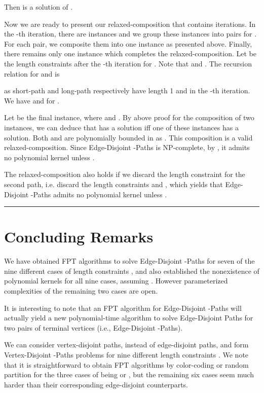 \documentclass{llncs}
\def\qed{\rule{1.5mm}{3mm}}
\begin{document}
{	Then  is a solution of . 
	

	Now we are ready to present our relaxed-composition that contains  iterations.
	In the -th iteration, there are  instances and 
	we group these instances into  pairs for . 
	For each pair, we composite them into one instance as presented above. 
	Finally, there remains only one instance which completes the relaxed-composition.
	Let  be the length constraints after the -th iteration for . 
	Note that  and . 
	The recursion relation for  and  is 
	 
	as short-path and long-path respectively have length 1 and  in the -th iteration. 
	We have  and  for . 
	
	Let  be the final instance, 
	where  and . 
	By above proof for the composition of two instances, 
	we can deduce that  has a solution 
	iff one of these  instances has a solution. 
	Both  and  are polynomially bounded in  as . 
	This composition is a valid relaxed-composition. 
	Since {\sc Edge-Disjoint -Paths} is NP-complete, by , 
	it admits no polynomial kernel unless . 
	
	The relaxed-composition also holds if we discard the length constraint for the second path, i.e. 
	discard the length constraints  and , 
	which yields that {\sc Edge-Disjoint -Paths} 
	admits no polynomial kernel unless .
	\qed} 

\section{Concluding Remarks}

We have obtained FPT algorithms to solve {\sc Edge-Disjoint -Paths}
for seven of the nine different cases of length constraints ,
and also established the nonexistence of polynomial kernels for all nine cases,
assuming .
However parameterized complexities of the remaining two cases are open. 


It is interesting to note that an FPT algorithm for
{\sc Edge-Disjoint -Paths} will actually yield a new polynomial-time
algorithm to solve {\sc Edge-Disjoint Paths} for two pairs of terminal vertices (i.e.,
{\sc Edge-Disjoint -Paths}).

We can consider vertex-disjoint paths, instead of edge-disjoint paths,
and form {\sc Vertex-Disjoint -Paths} problems for nine different length
constraints .
We note that it is straightforward to obtain FPT algorithms by color-coding
or random partition for the three cases of 
being  or ,
but the remaining six cases seem much harder than their corresponding edge-disjoint
counterparts.
\end{document}
